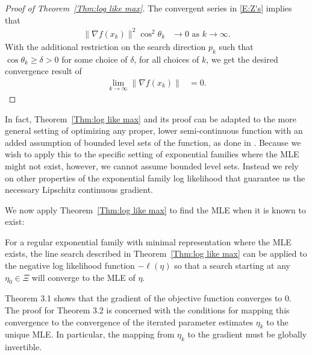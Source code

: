 \begin{proof}[Proof of Theorem~\ref{Thm:log like max}]
The convergent series in \eqref{E:Z's} implies that 
\begin{align*}
	\lVert \nabla f(x_k) \rVert ^2 \cos^2 \theta_k  &\to 0 \text{ as } k \to \infty.
\end{align*}
With the additional restriction on the search direction $p_k$ such that $\cos \theta_k 
\geq \delta > 0$ for some choice 
of $\delta$, for all choices of $k$, we get the desired convergence result of
\begin{align*}
	\lim_{k \to \infty} \lVert \nabla f(x_k) \rVert &= 0.
\end{align*}

\end{proof}




In fact, Theorem~\ref{Thm:log like max} and its proof can be adapted to the more
general setting
of optimizing any proper, lower semi-continuous function with an added assumption of 
bounded level sets of the function, as done in \citep{Okabayashi:longrange}.  Because 
we wish to apply this to the specific setting of exponential families where the MLE 
might not exist, however, we cannot
assume bounded level sets.  Instead we rely on other properties of the exponential
family log likelihood that guarantee us the necessary Lipschitz continuous gradient.  

We now apply Theorem~\ref{Thm:log like max} to find the MLE when it is known to exist:  

\begin{theorem} \label{Thm:Line Search works}
For a regular exponential family with minimal representation where the MLE exists, the 
line search described in 
Theorem~\ref{Thm:log like max} can be applied to the negative log likelihood function 
$-\ell(\eta)$ so that a search 
starting at any $\eta_0 \in \Xi$ will converge to the MLE of $\eta$.
\end{theorem}

Theorem 3.1 shows that the gradient of the objective function converges to 0.  The 
proof for Theorem 3.2 is concerned 
with the conditions for mapping this convergence to the convergence of the iterated 
parameter estimates $\eta_k$ to the 
unique MLE.  In particular, the mapping from $\eta_k$ to the gradient must be globally 
invertible.


